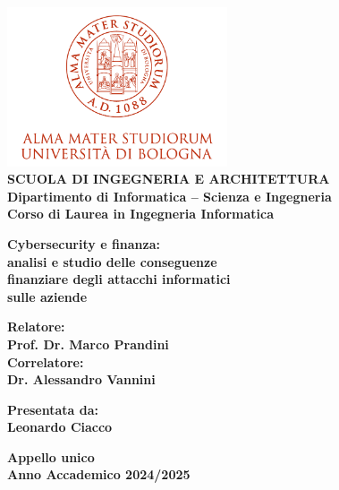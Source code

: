 \begin{titlepage}
\begin{center}
\includegraphics[width=2.56in]{figures/logo/logo_unibo.png}\\
\vspace{5mm}
{\small{\bf SCUOLA DI INGEGNERIA E ARCHITETTURA\\
\vspace{2mm}
Dipartimento di Informatica -- Scienza e Ingegneria\\
\vspace{2mm}
Corso di Laurea in Ingegneria Informatica }}
\end{center}
\vspace{3,8mm}
\begin{center}
{\LARGE{\bf Cybersecurity e finanza:\\
\vspace{3,5mm}
analisi e studio delle conseguenze\\
\vspace{3,5mm}
finanziare degli attacchi informatici\\
\vspace{3,5mm}
sulle aziende\\
\vspace{3,5mm}}}
  
\end{center}
\vspace{9,5mm}
\par
\noindent
\begin{minipage}[t]{0.47\textwidth}
{\normalsize{\bf Relatore:\\
Prof. Dr. Marco Prandini\\

Correlatore:\\
Dr. Alessandro Vannini}}
\end{minipage}
\hfill
\begin{minipage}[t]{0.47\textwidth}\raggedleft
{\normalsize{\bf Presentata da:\\
Leonardo Ciacco}}
\end{minipage}
\vspace{7,5mm} %
\begin{center}
{\normalsize{\bf Appello unico\\%
Anno Accademico 2024/2025}}%
\end{center}
\end{titlepage}
